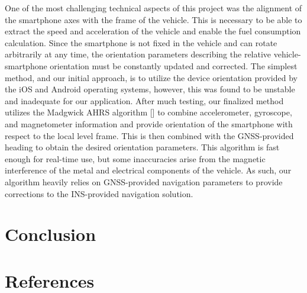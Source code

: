 \documentclass[11pt, oneside]{article}
\newcounter{refno}
\newcommand{\reflabel}[1]{\refstepcounter{refno}\label{#1}[\arabic{refno}]}  %
\begin{document}
One of the most challenging technical aspects of this project was the alignment of the smartphone axes with the frame of the vehicle.  This is necessary to be able to extract the speed and acceleration of the vehicle and enable the fuel consumption calculation.  Since the smartphone is not fixed in the vehicle and can rotate arbitrarily at any time, the orientation parameters describing the relative vehicle-smartphone orientation must be constantly updated and corrected.  The simplest method, and our initial approach, is to utilize the device orientation provided by the iOS and Android operating systems, however, this was found to be unstable and inadequate for our application.  After much testing, our finalized method utilizes the Madgwick AHRS algorithm \reflabel{madgwick} to combine accelerometer, gyroscope, and magnetometer information and provide orientation of the smartphone with respect to the local level frame.  This is then combined with the GNSS-provided heading to obtain the desired orientation parameters.  This algorithm is fast enough for real-time use, but some inaccuracies arise from the magnetic interference of the metal and electrical components of the vehicle.  As such, our algorithm heavily relies on GNSS-provided navigation parameters to provide corrections to the INS-provided navigation solution.

\section{Conclusion}
 
\section{References}
\end{document}
